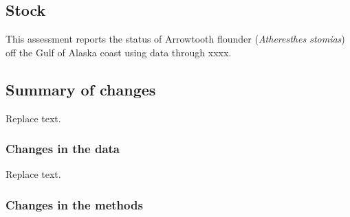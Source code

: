 \documentclass[11pt,
  english,
  a4paper,
]{article}
\begin{document}
\leavevmode\tagmcend\tagstructend


\hypertarget{stock}{%
\subsection*{Stock}\label{stock}}

\leavevmode\tagmcend\tagstructend


This assessment reports the status of Arrowtooth flounder (\emph{Atheresthes stomias}) off the Gulf of Alaska coast using data through xxxx.

\leavevmode\tagmcend\tagstructend\par


\hypertarget{summary-of-changes}{%
\subsection*{Summary of changes}\label{summary-of-changes}}

\leavevmode\tagmcend\tagstructend


Replace text.

\leavevmode\tagmcend\tagstructend\par


\hypertarget{changes-in-the-data}{%
\subsubsection*{Changes in the data}\label{changes-in-the-data}}

\leavevmode\tagmcend\tagstructend


Replace text.

\leavevmode\tagmcend\tagstructend\par


\hypertarget{changes-in-the-methods}{%
\subsubsection*{Changes in the methods}\label{changes-in-the-methods}}
\end{document}
